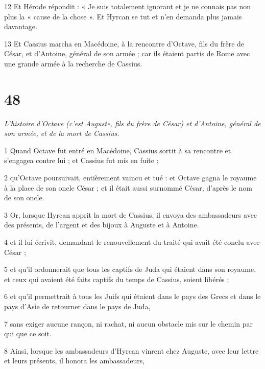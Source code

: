 \par 12 Et Hérode répondit : « Je suis totalement ignorant et je ne connais pas non plus la « cause de la chose ». Et Hyrcan se tut et n’en demanda plus jamais davantage.

\par 13 Et Cassius marcha en Macédoine, à la rencontre d'Octave, fils du frère de César, et d'Antoine, général de son armée ; car ils étaient partis de Rome avec une grande armée à la recherche de Cassius.

\chapter{48}

\par \textit{L'histoire d'Octave (c'est Auguste, fils du frère de César) et d'Antoine, général de son armée, et de la mort de Cassius.}

\par 1 Quand Octave fut entré en Macédoine, Cassius sortit à sa rencontre et s'engagea contre lui ; et Cassius fut mis en fuite ;

\par 2 qu'Octave poursuivait, entièrement vaincu et tué : et Octave gagna le royaume à la place de son oncle César ; et il était aussi surnommé César, d'après le nom de son oncle.

\par 3 Or, lorsque Hyrcan apprit la mort de Cassius, il envoya des ambassadeurs avec des présents, de l'argent et des bijoux à Auguste et à Antoine.

\par 4 et il lui écrivit, demandant le renouvellement du traité qui avait été conclu avec César ;

\par 5 et qu'il ordonnerait que tous les captifs de Juda qui étaient dans son royaume, et ceux qui avaient été faits captifs du temps de Cassius, soient libérés ;

\par 6 et qu'il permettrait à tous les Juifs qui étaient dans le pays des Grecs et dans le pays d'Asie de retourner dans le pays de Juda,

\par 7 sans exiger aucune rançon, ni rachat, ni aucun obstacle mis sur le chemin par qui que ce soit.

\par 8 Ainsi, lorsque les ambassadeurs d'Hyrcan vinrent chez Auguste, avec leur lettre et leurs présents, il honora les ambassadeurs,

